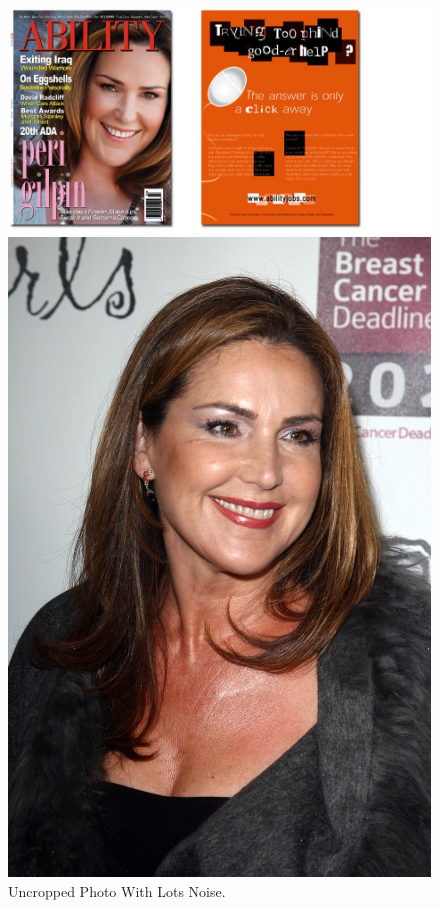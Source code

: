 \documentclass[12pt]{article} %
\begin{document}
\begin{figure}[H] %
  \centering 
  \begin{minipage}[b]{0.3\textwidth}
    \includegraphics[width=\textwidth]{part1_1a}
    \caption{Uncropped Photo With Lots Noise.}
  \end{minipage}
  \begin{minipage}[b]{0.3\textwidth}
    \includegraphics[width=\textwidth]{part1_1b}

\end{minipage}
\end{figure}
\end{document}

